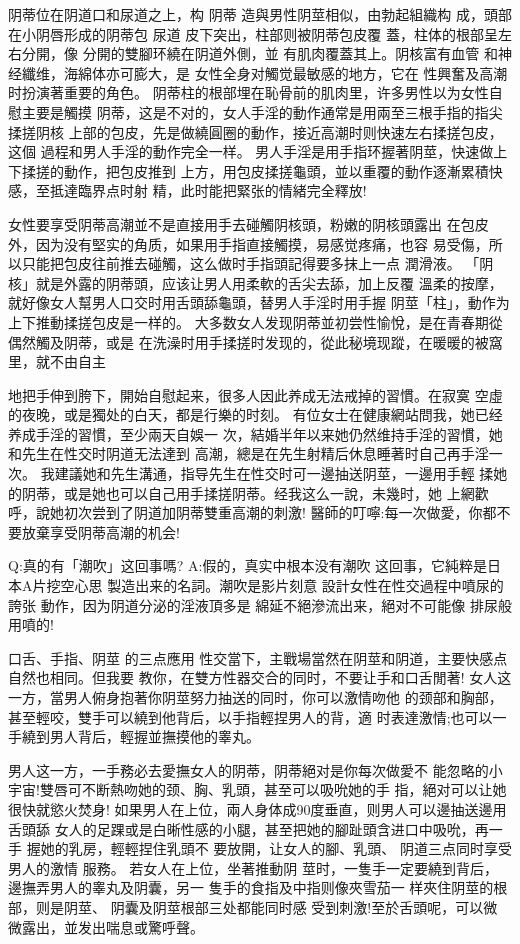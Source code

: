 \documentclass[12pt,UTF8]{ctexbook}
\begin{document}
阴蒂位在阴道口和尿道之上，构
阴蒂
造與男性阴莖相似，由勃起組織构
成，頭部在小阴唇形成的阴蒂包
尿道
皮下突出，柱部则被阴蒂包皮覆
蓋，柱体的根部呈左右分開，像
分開的雙腳环繞在阴道外側，並
有肌肉覆蓋其上。阴核富有血管
和神经纖维，海綿体亦可膨大，是
女性全身对觸觉最敏感的地方，它在
性興奮及高潮时扮演著重要的角色。
阴蒂柱的根部埋在恥骨前的肌肉里，许多男性以为女性自慰主要是觸摸
阴蒂，这是不对的，女人手淫的動作通常是用兩至三根手指的指尖揉搓阴核
上部的包皮，先是做繞圓圈的動作，接近高潮时则快速左右揉搓包皮，这個
過程和男人手淫的動作完全一样。
男人手淫是用手指环握著阴莖，快速做上下揉搓的動作，把包皮推到
上方，用包皮揉搓龜頭，並以重覆的動作逐漸累積快感，至抵達臨界点时射
精，此时能把緊张的情緒完全釋放!

女性要享受阴蒂高潮並不是直接用手去碰觸阴核頭，粉嫩的阴核頭露出
在包皮外，因为没有堅实的角质，如果用手指直接觸摸，易感觉疼痛，也容
易受傷，所以只能把包皮往前推去碰觸，这么做时手指頭記得要多抹上一点
潤滑液。
「阴核」就是外露的阴蒂頭，应该让男人用柔軟的舌尖去舔，加上反覆
溫柔的按摩，就好像女人幫男人口交时用舌頭舔龜頭，替男人手淫时用手握
阴莖「柱」，動作为上下推動揉搓包皮是一样的。
大多数女人发现阴蒂並初尝性愉悅，是在青春期從偶然觸及阴蒂，或是
在洗澡时用手揉搓时发现的，從此秘境现蹤，在暖暖的被窩里，就不由自主

地把手伸到胯下，開始自慰起来，很多人因此养成无法戒掉的習慣。在寂寞
空虛的夜晚，或是獨处的白天，都是行樂的时刻。
有位女士在健康網站問我，她已经养成手淫的習慣，至少兩天自娛一
次，結婚半年以来她仍然维持手淫的習慣，她和先生在性交时阴道无法達到
高潮，總是在先生射精后休息睡著时自己再手淫一次。
我建議她和先生溝通，指导先生在性交时可一邊抽送阴莖，一邊用手輕
揉她的阴蒂，或是她也可以自己用手揉搓阴蒂。经我这么一說，未幾时，她
上網歡呼，說她初次尝到了阴道加阴蒂雙重高潮的刺激!
醫師的叮嚀:每一次做愛，你都不要放棄享受阴蒂高潮的机会!

Q:真的有「潮吹」这回事嗎?
A:假的，真实中根本没有潮吹
这回事，它純粹是日本A片挖空心思
製造出来的名詞。潮吹是影片刻意
設計女性在性交過程中噴尿的誇张
動作，因为阴道分泌的淫液頂多是
綿延不絕滲流出来，絕对不可能像
排尿般用噴的!

口舌、手指、阴莖
的三点應用
性交當下，主戰場當然在阴莖和阴道，主要快感点自然也相同。但我要
教你，在雙方性器交合的同时，不要让手和口舌閒著!
女人这一方，當男人俯身抱著你阴莖努力抽送的同时，你可以激情吻他
的颈部和胸部，甚至輕咬，雙手可以繞到他背后，以手指輕捏男人的背，適
时表達激情;也可以一手繞到男人背后，輕握並撫摸他的睾丸。

男人这一方，一手務必去愛撫女人的阴蒂，阴蒂絕对是你每次做愛不
能忽略的小宇宙!雙唇可不断熱吻她的颈、胸、乳頭，甚至可以吸吮她的手
指，絕对可以让她很快就慾火焚身!
如果男人在上位，兩人身体成90度垂直，则男人可以邊抽送邊用舌頭舔
女人的足踝或是白晰性感的小腿，甚至把她的腳趾頭含进口中吸吮，再一手
握她的乳房，輕輕捏住乳頭不
要放開，让女人的腳、乳頭、
阴道三点同时享受男人的激情
服務。
若女人在上位，坐著推動阴
莖时，一隻手一定要繞到背后，
邊撫弄男人的睾丸及阴囊，另一
隻手的食指及中指则像夾雪茄一
样夾住阴莖的根部，则是阴莖、
阴囊及阴莖根部三处都能同时感
受到刺激!至於舌頭呢，可以微
微露出，並发出喘息或驚呼聲。
\end{document}
